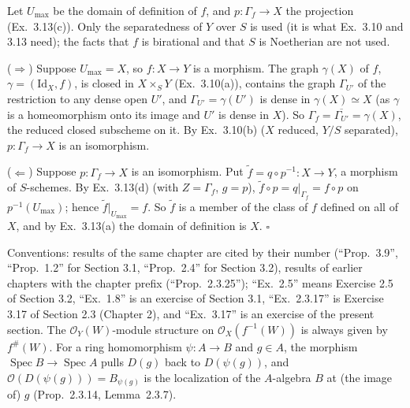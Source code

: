 \documentclass[11pt]{article}
\begin{document}
\pf
Let $U_{\max}$ be the domain of definition of $f$, and $p:\Gamma_f\to X$ the projection (Ex.~3.13(c)). Only the separatedness of $Y$ over $S$ is used (it is what Ex.~3.10 and 3.13 need); the facts that $f$ is birational and that $S$ is Noetherian are not used.

($\Rightarrow$) Suppose $U_{\max}=X$, so $f:X\to Y$ is a morphism. The graph $\gamma(X)$ of $f$, $\gamma=(\mathrm{Id}_X,f)$, is closed in $X\times_SY$ (Ex.~3.10(a)), contains the graph $\Gamma_{U'}$ of the restriction to any dense open $U'$, and $\Gamma_{U'}=\gamma(U')$ is dense in $\gamma(X)\simeq X$ (as $\gamma$ is a homeomorphism onto its image and $U'$ is dense in $X$). So $\Gamma_f=\overline{\Gamma_{U'}}=\gamma(X)$, the reduced closed subscheme on it. By Ex.~3.10(b) ($X$ reduced, $Y/S$ separated), $p:\Gamma_f\to X$ is an isomorphism.

($\Leftarrow$) Suppose $p:\Gamma_f\to X$ is an isomorphism. Put $\tilde f=q\circ p^{-1}:X\to Y$, a morphism of $S$-schemes. By Ex.~3.13(d) (with $Z=\Gamma_f$, $g=p$), $\tilde f\circ p=q|_{\Gamma_f}=f\circ p$ on $p^{-1}(U_{\max})$; hence $\tilde f|_{U_{\max}}=f$. So $\tilde f$ is a member of the class of $f$ defined on all of $X$, and by Ex.~3.13(a) the domain of definition is $X$. \hfill$\square$

\pf
Conventions: results of the same chapter are cited by their number (``Prop.~3.9'', ``Prop.~1.2'' for Section 3.1, ``Prop.~2.4'' for Section 3.2), results of earlier chapters with the chapter prefix (``Prop.~2.3.25''); ``Ex.~2.5'' means Exercise 2.5 of Section 3.2, ``Ex.~1.8'' is an exercise of Section 3.1, ``Ex.~2.3.17'' is Exercise 3.17 of Section 2.3 (Chapter 2), and ``Ex.~3.17'' is an exercise of the present section. The $\mathcal{O}_Y(W)$-module structure on $\mathcal{O}_X(f^{-1}(W))$ is always given by $f^\#(W)$. For a ring homomorphism $\psi:A\to B$ and $g\in A$, the morphism $\operatorname{Spec}B\to\operatorname{Spec}A$ pulls $D(g)$ back to $D(\psi(g))$, and $\mathcal{O}(D(\psi(g)))=B_{\psi(g)}$ is the localization of the $A$-algebra $B$ at (the image of) $g$ (Prop.~2.3.14, Lemma~2.3.7).
\end{document}

